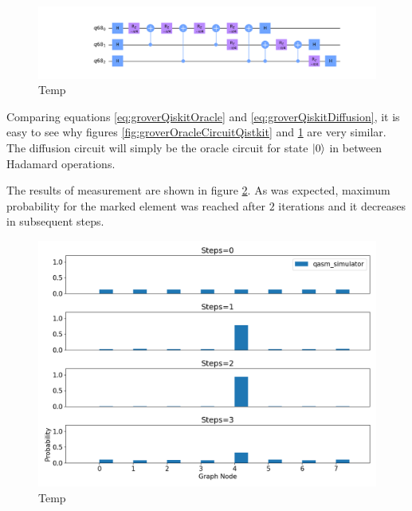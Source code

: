 \documentclass[../../dissertation.tex]{subfiles}
\begin{document}
\begin{figure}[!h]
	\centering
	\includegraphics[scale=0.30]{img/Qiskit/GroverQiskit/Circuits/GroverQiskitCircDiff_N3_M4_S3.png}
	\caption{Temp}
	\label{fig:groverDiffCircuitQistkit}
\end{figure}\par
Comparing equations \ref{eq:groverQiskitOracle} and \ref{eq:groverQiskitDiffusion}, it is easy to see why figures \ref{fig:groverOracleCircuitQistkit} and \ref{fig:groverDiffCircuitQistkit} are very similar. The diffusion circuit will simply be the oracle circuit for state $\ket{0}$ in between Hadamard operations.

The results of measurement are shown in figure \ref{fig:groverQiskitDist}. As was expected, maximum probability for the marked element was reached after $2$ iterations and it decreases in subsequent steps.
\begin{figure}[!h]
	\centering
	\includegraphics[scale=0.40]{img/Qiskit/GroverQiskit/GroverQiskitSearch_N3_M4_S0123}
	\caption{Temp}
	\label{fig:groverQiskitDist}
\end{figure}
%
\end{document}
